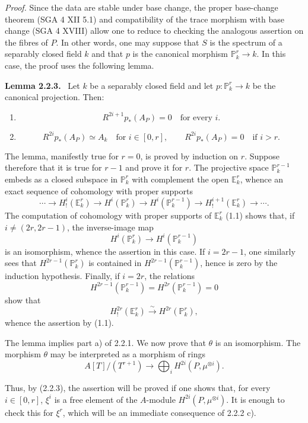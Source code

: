 \documentclass[11pt]{article}
\newenvironment{statement}[1]{\par\medskip\noindent\textbf{#1.}\ }{\par\medskip}
\begin{document}
\emph{Proof.} Since the data are stable under base change, the proper base-change theorem (SGA 4 XII 5.1) and compatibility of the trace morphism with base change (SGA 4 XVIII) allow one to reduce to checking the analogous assertion on the fibres of $P$. In other words, one may suppose that $S$ is the spectrum of a separably closed field $k$ and that $p$ is the canonical morphism $\mathbb P^r_k\to k$. In this case, the proof uses the following lemma.

\begin{statement}{Lemma 2.2.3}
Let $k$ be a separably closed field and let $p:\mathbb P_k^r\to k$ be the canonical projection. Then:
\begin{enumerate}[label=\alph*)]
\item
\[
R^{2i+1}p_*(A_P)=0\quad\text{for every }i.
\]
\item
\[
R^{2i}p_*(A_P)\simeq A_k\quad\text{for }i\in[0,r],
\qquad
R^{2i}p_*(A_P)=0\quad\text{if }i>r.
\]
\end{enumerate}
\end{statement}

The lemma, manifestly true for $r=0$, is proved by induction on $r$. Suppose therefore that it is true for $r-1$ and prove it for $r$. The projective space $\mathbb P_k^{r-1}$ embeds as a closed subspace in $\mathbb P_k^r$ with complement the open $\mathbb E_k^r$, whence an exact sequence of cohomology with proper supports
\[
\cdots\longrightarrow H_!^i(\mathbb E_k^r)\longrightarrow H^i(\mathbb P_k^r)
\longrightarrow H^i(\mathbb P_k^{r-1})\longrightarrow H_!^{i+1}(\mathbb E_k^r)\longrightarrow\cdots.
\]
The computation of cohomology with proper supports of $\mathbb E_k^r$ (1.1) shows that, if $i\ne(2r,2r-1)$, the inverse-image map
\[
H^i(\mathbb P_k^r)\longrightarrow H^i(\mathbb P_k^{r-1})
\]
is an isomorphism, whence the assertion in this case. If $i=2r-1$, one similarly sees that $H^{2r-1}(\mathbb P_k^r)$ is contained in $H^{2r-1}(\mathbb P_k^{r-1})$, hence is zero by the induction hypothesis. Finally, if $i=2r$, the relations
\[
H^{2r-1}(\mathbb P_k^{r-1})=H^{2r}(\mathbb P_k^{r-1})=0
\]
show that
\[
H_!^{2r}(\mathbb E_k^r)\xrightarrow{\sim}H^{2r}(\mathbb P_k^r),
\]
whence the assertion by (1.1).

The lemma implies part a) of 2.2.1. We now prove that $\theta$ is an isomorphism. The morphism $\theta$ may be interpreted as a morphism of rings
\[
A[T]/(T^{r+1})\longrightarrow\bigoplus_i H^{2i}(P,\mu^{\otimes i}).
\]


Thus, by (2.2.3), the assertion will be proved if one shows that, for every $i\in[0,r]$, $\xi^i$ is a free element of the $A$-module $H^{2i}(P,\mu^{\otimes i})$. It is enough to check this for $\xi^r$, which will be an immediate consequence of 2.2.2 c).
\end{document}
